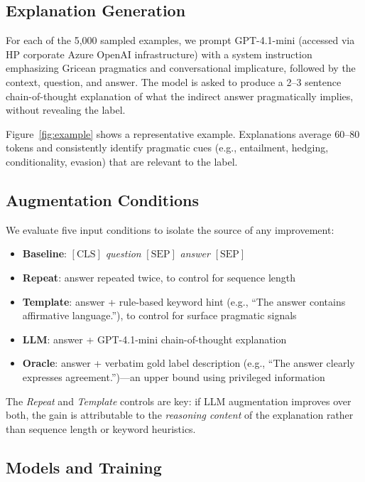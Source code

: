 \documentclass[11pt,a4paper]{article}
\begin{document}
\subsection{Explanation Generation}

For each of the 5,000 sampled examples, we prompt GPT-4.1-mini (accessed via HP corporate Azure OpenAI infrastructure) with a system instruction emphasizing Gricean pragmatics and conversational implicature, followed by the context, question, and answer. The model is asked to produce a 2--3 sentence chain-of-thought explanation of what the indirect answer pragmatically implies, without revealing the label.

Figure~\ref{fig:example} shows a representative example. Explanations average 60--80 tokens and consistently identify pragmatic cues (e.g., entailment, hedging, conditionality, evasion) that are relevant to the label.

\subsection{Augmentation Conditions}

We evaluate five input conditions to isolate the source of any improvement:

\begin{itemize}\setlength{\itemsep}{2pt}
  \item \textbf{Baseline}: $[\text{CLS}]$ \textit{question} $[\text{SEP}]$ \textit{answer} $[\text{SEP}]$
  \item \textbf{Repeat}: answer repeated twice, to control for sequence length
  \item \textbf{Template}: answer + rule-based keyword hint (e.g., ``The answer contains affirmative language.''), to control for surface pragmatic signals
  \item \textbf{LLM}: answer + GPT-4.1-mini chain-of-thought explanation
  \item \textbf{Oracle}: answer + verbatim gold label description (e.g., ``The answer clearly expresses agreement.'')---an upper bound using privileged information
\end{itemize}

The \textit{Repeat} and \textit{Template} controls are key: if LLM augmentation improves over both, the gain is attributable to the \textit{reasoning content} of the explanation rather than sequence length or keyword heuristics.

\subsection{Models and Training}
\end{document}
